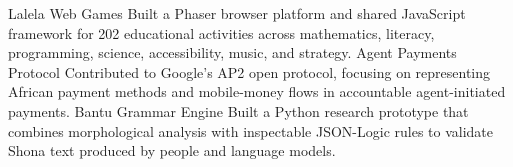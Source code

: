
\begin{cvskills}
\cvskill
  {Lalela Web Games}
  {Built a Phaser browser platform and shared JavaScript framework for 202 educational activities across mathematics, literacy, programming, science, accessibility, music, and strategy.}
\cvskill
  {Agent Payments Protocol}
  {Contributed to Google's AP2 open protocol, focusing on representing African payment methods and mobile-money flows in accountable agent-initiated payments.}
\cvskill
  {Bantu Grammar Engine}
  {Built a Python research prototype that combines morphological analysis with inspectable JSON-Logic rules to validate Shona text produced by people and language models.}
\end{cvskills}
